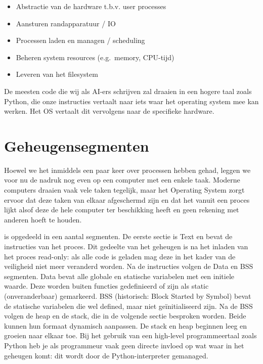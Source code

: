 \begin{itemize}
\tightlist
\item
  Abstractie van de hardware t.b.v. user processes
\item
  Aansturen randapparatuur / IO
\item
  Processen laden en managen / scheduling
\item
  Beheren system resources (e.g.~memory, CPU-tijd)
\item
  Leveren van het filesystem
\end{itemize}

De meesten code die wij als AI-ers schrijven zal draaien in een hogere taal zoals Python, die onze instructies vertaalt naar iets waar het operating system mee kan werken. Het OS vertaalt dit vervolgens naar de specifieke hardware.


\section{Geheugensegmenten}\label{geheugensegmenten}

Hoewel we het inmiddels een paar keer over processen hebben gehad,
leggen we voor nu de nadruk nog even op een computer met een enkele
taak. Moderne computers draaien vaak vele taken tegelijk, maar het Operating System zorgt ervoor dat deze taken van elkaar afgeschermd zijn en dat het vanuit een proces lijkt alsof deze de hele computer ter beschikking heeft en geen rekening met anderen hoeft te houden.

 is opgedeeld in een aantal segmenten. De eerste sectie is Text en bevat de instructies van het proces. Dit gedeelte van het geheugen is na het inladen van het proces read-only: als alle code is geladen mag deze in het kader van de veiligheid niet meer veranderd worden. Na de instructies volgen de Data en BSS segmenten. Data bevat alle globale en statische variabelen met een initiele waarde. Deze worden buiten functies gedefinieerd of zijn als static (onveranderbaar) gemarkeerd. BSS (historisch: Block Started by Symbol) bevat de statische variabelen die wel defined, maar niet geïnitialiseerd zijn. Na de BSS volgen de heap en de stack, die in de volgende sectie besproken worden. Beide kunnen hun formaat dynamisch aanpassen. De stack en heap beginnen leeg en groeien naar elkaar toe. Bij het gebruik van een high-level programmeertaal zoals Python heb je als programmeur vaak geen directe invloed op wat waar in het geheugen komt: dit wordt door de Python-interpreter gemanaged.

